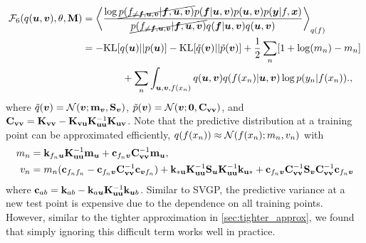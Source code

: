 \begin{align}
    {\mathcal{F}}_6(q({\bm{u}}, {\bm{v}}), \theta, {\mathbf{M}}) 
        &= \left \langle \frac {\log \cancel{p(f_{\neq {\bm{f}}, {\bm{u}}, {\bm{v}}} | {\bm{f}}, {\bm{u}}, {\bm{v}})} p({\bm{f}} | {\bm{u}}, {\bm{v}}) p({\bm{u}}, {\bm{v}}) p({\bm{y}} | f, {\bm{x}}) } {\cancel{p(f_{\neq {\bm{f}}, {\bm{u}}, {\bm{v}}} | {\bm{f}}, {\bm{u}}, {\bm{v}})} q({\bm{f}} | {\bm{u}}, {\bm{v}}) q({\bm{u}}, {\bm{v}})} \right \rangle_{q(f)} \nonumber \\
        &= - \mathrm{KL} [q({\bm{u}}) || p({\bm{u}})] - \mathrm{KL} [\tilde{q}({\bm{v}}) || \tilde{p}({\bm{v}})] + \frac{1}{2}\sum_n [1 + \log(m_n) - m_n] \nonumber \\ & \qquad \qquad +  \sum_{n} \int_{{\bm{u}},{\bm{v}},f(x_n)} q({\bm{u}},{\bm{v}}) q(f({x_n}) | {\bm{u}}, {\bm{v}}) \log p(y_n | f({x_n})). \label{eq:tighter_solvegp},
\end{align}
where $\tilde{q}({\bm{v}}) = {\mathcal{N}}({\bm{v}}; {\mathbf{m}}_{\bm{v}}, {\mathbf{S}}_{\bm{v}})$, $\tilde{p}({\bm{v}}) = {\mathcal{N}}({\bm{v}}; {\bm{0}}, \mathbf{C}_{\mathbf{vv}})$, and $\mathbf{C}_{\mathbf{vv}} = \mathbf{K}_{\mathbf{vv}} - \mathbf{K}_{\mathbf{vu}}\mathbf{K}_{\mathbf{uu}}^{-1}\mathbf{K}_{\mathbf{uv}}$. Note that the predictive distribution at a training point can be approximated efficiently, $q(f(x_n)) \approx {\mathcal{N}}(f(x_n); m_n, v_n)$ with 
\begin{align}
    m_n &= \mathbf{k}_{f_n{\bm{u}}} \mathbf{K}_{\mathbf{uu}}^{-1} {\mathbf{m}}_{\bm{u}} + \mathbf{c}_{f_n{\bm{v}}} \mathbf{C}_{\mathbf{vv}}^{-1} {\mathbf{m}}_{\bm{u}}, \nonumber \\
    v_n &= m_n (\mathbf{c}_{f_nf_n} - \mathbf{c}_{f_n{\bm{v}}} \mathbf{C}_{\mathbf{vv}}^{-1} \mathbf{c}_{{\bm{v}} f_n})  + \mathbf{k}_{\mathbf{*u}} \mathbf{K}_{\mathbf{uu}}^{-1} {\mathbf{S}}_{\bm{u}} \mathbf{K}_{\mathbf{uu}}^{-1} \mathbf{k}_{\mathbf{u*}} + \mathbf{c}_{f_n{\bm{v}}} \mathbf{C}_{\mathbf{vv}}^{-1} {\mathbf{S}}_{\bm{v}} \mathbf{C}_{\mathbf{vv}}^{-1} \mathbf{c}_{f_n{\bm{v}}} \nonumber
\end{align}
where $\mathbf{c}_{ab} = \mathbf{k}_{ab} - \mathbf{k}_{a{\bm{u}}} \mathbf{K}_{\mathbf{uu}}^{-1} \mathbf{k}_{{\bm{u}} b}$. Similar to SVGP, the predictive variance at a new test point is expensive due to the dependence on all training points. However, similar to the tighter approximation in \cref{sec:tighter_approx}, we found that simply ignoring this difficult term works well in practice.


